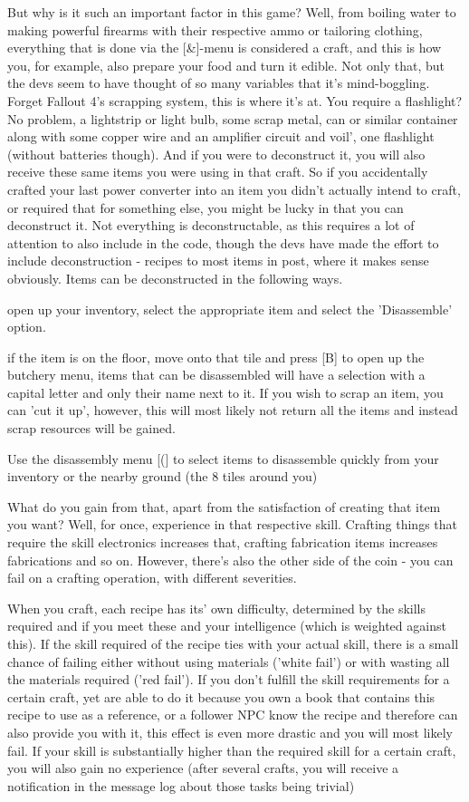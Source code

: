 \documentclass[11pt]{report}
\begin{document}
But why is it such an important factor in this game? Well, from boiling water to making powerful firearms with their respective ammo or tailoring clothing, everything that is done via the [\&]-menu is considered a craft, and this is how you, for example, also prepare your food and turn it edible. Not only that, but the devs seem to have thought of so many variables that it's mind-boggling. Forget Fallout 4's scrapping system, this is where it's at. You require a flashlight? No problem, a lightstrip or light bulb, some scrap metal, can or similar container along with some copper wire and an amplifier circuit and voil', one flashlight (without batteries though). And if you were to deconstruct it, you will also receive these same items you were using in that craft. So if you accidentally crafted your last power converter into an item you didn't actually intend to craft, or required that for something else, you might be lucky in that you can deconstruct it. Not everything is deconstructable, as this requires a lot of attention to also include in the code, though the devs have made the effort to include deconstruction - recipes to most items in post, where it makes sense obviously. Items can be deconstructed in the following ways.

open up your inventory, select the appropriate item and select the 'Disassemble' option.

if the item is on the floor, move onto that tile and press [B] to open up the butchery menu, items that can be disassembled will have a selection with a capital letter and only their name next to it. If you wish to scrap an item, you can 'cut it up', however, this will most likely not return all the items and instead scrap resources will be gained.

Use the disassembly menu [(] to select items to disassemble quickly from your inventory or the nearby ground (the 8 tiles around you)

What do you gain from that, apart from the satisfaction of creating that item you want? Well, for once, experience in that respective skill. Crafting things that require the skill electronics increases that, crafting fabrication items increases fabrications and so on. However, there's also the other side of the coin - you can fail on a crafting operation, with different severities.

When you craft, each recipe has its' own difficulty, determined by the skills required and if you meet these and your intelligence (which is weighted against this). If the skill required of the recipe ties with your actual skill, there is a small chance of failing either without using materials ('white fail') or with wasting all the materials required ('red fail'). If you don't fulfill the skill requirements for a certain craft, yet are able to do it because you own a book that contains this recipe to use as a reference, or a follower NPC know the recipe and therefore can also provide you with it, this effect is even more drastic and you will most likely fail. If your skill is substantially higher than the required skill for a certain craft, you will also gain no experience (after several crafts, you will receive a notification in the message log about those tasks being trivial)
\end{document}
